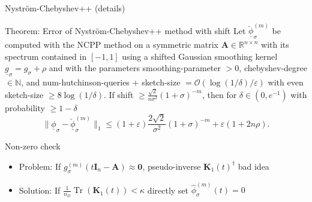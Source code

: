 \documentclass[aspectratio=169, leqno, 12pt]{beamer}
\newcommand{\mtx}[1]{\boldsymbol{#1}}
\DeclareMathOperator{\Tr}{Tr}
\begin{document}
\begin{frame}{Nystr\"om-Chebyshev++ (details)}
    \begin{block}{Theorem: Error of Nystr\"om-Chebyshev++ method with shift}
        Let $\breve{\underline{\phi}}_{\sigma}^{(m)}$ be computed with the
        \gls{NCPP} method on a symmetric matrix
        $\mtx{A} \in \mathbb{R}^{n \times n}$ with its spectrum contained in $[-1, 1]$
        using a shifted Gaussian smoothing kernel $\underline{g}_{\sigma} = g_{\sigma} + \rho$
        and with the parameters \gls{smoothing-parameter} $>0$, \gls{chebyshev-degree} $\in \mathbb{N}$, and
        \gls{num-hutchinson-queries} $+$ \gls{sketch-size} $=\mathcal{O}(\log(1/\delta)/\varepsilon)$
        with even \gls{sketch-size} $\geq 8 \log(1/\delta)$.
        If \gls{shift} $\geq \frac{\sqrt{2}}{n\sigma^2} (1 + \sigma)^{-m}$, then
        for $\delta \in (0, e^{-1})$ with probability $\geq 1-\delta$
        \begin{equation}
            \lVert \underline{\phi}_{\sigma} - \breve{\underline{\phi}}_{\sigma}^{(m)} \rVert _1
            \leq (1 + \varepsilon)  \frac{2\sqrt{2}}{\sigma^2} (1 + \sigma)^{-m} + \varepsilon(1 + 2 n \rho).
        \end{equation}
    \end{block}
\end{frame}

\begin{frame}{Non-zero check}
    \begin{itemize}
        \item Problem: If $g_{\sigma}^{(m)}(t\mtx{I}_n - \mtx{A}) \approx \mtx{0}$, pseudo-inverse $\mtx{K}_1(t)^{\dagger}$ bad idea
        \item Solution: If $\frac{1}{n_{\Omega}} \Tr(\mtx{K}_1(t)) < \kappa$ directly set $\widehat{\phi}_{\sigma}^{(m)}(t) = 0$
    \end{itemize}
    \centering
    \scalebox{0.8}{}
\end{frame}
\end{document}
